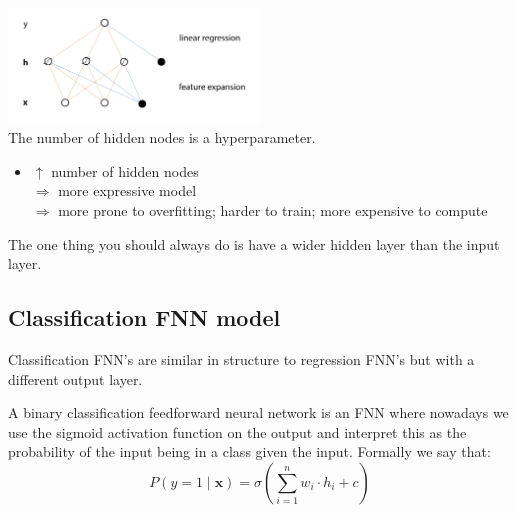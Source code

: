 \documentclass[12pt]{article}
\begin{document}
\begin{multicols}{2}
    \includegraphics[width=0.5\textwidth]{assets/regFNN.png}
    \columnbreak \\ 
    The number of hidden nodes is a hyperparameter.
    \begin{itemize}[leftmargin=*, noitemsep]
        \item $\uparrow$ number of hidden nodes 
        \\ $\Rightarrow$ more expressive model 
        \\ $\Rightarrow$ more prone to overfitting; harder to train; more expensive to compute
    \end{itemize}
    The one thing you should always do is have a wider hidden layer than the input layer.
\end{multicols}

\subsection{Classification FNN model}

Classification FNN's are similar in structure to regression FNN's but with a different output layer.

\begin{definition}
    A binary classification feedforward neural network is an FNN where nowadays we use the sigmoid activation function on the output and interpret this as the probability of the input being in a class given the input. Formally we say that: 
    \[
        P(y = 1 \mid \mathbf x) = \sigma\left(\sum_{i=1}^n w_i \cdot h_i + c\right)  
    \]
    
\end{definition}
\end{document}
